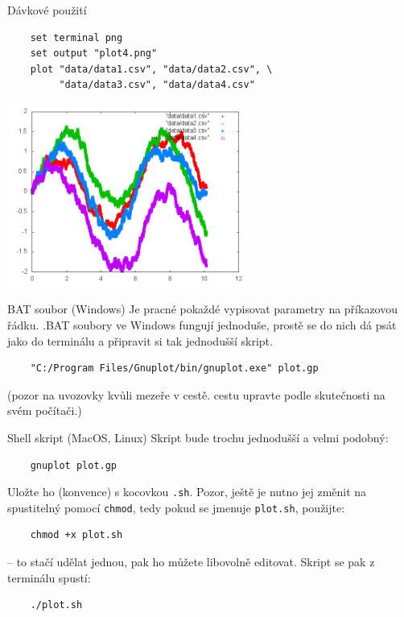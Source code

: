 \documentclass{beamer}
\begin{document}
\begin{frame}[fragile]{Dávkové použití}
  \scriptsize
  \begin{verbatim}
    set terminal png
    set output "plot4.png"
    plot "data/data1.csv", "data/data2.csv", \
         "data/data3.csv", "data/data4.csv"
  \end{verbatim}
  \pause
  \begin{center}
    \includegraphics[width=0.6\textwidth]{../gnuplot/plot4}
  \end{center}
\end{frame}

\begin{frame}[fragile]{BAT soubor (Windows)}
  Je pracné pokaždé vypisovat parametry na příkazovou řádku. .BAT soubory ve Windows fungují jednoduše, prostě se do nich dá psát jako do terminálu a připravit si tak jednodušší skript.
  {\scriptsize
  \begin{verbatim}
    "C:/Program Files/Gnuplot/bin/gnuplot.exe" plot.gp
  \end{verbatim}
  }
  (pozor na uvozovky kvůli mezeře v cestě. cestu upravte podle skutečnosti na svém počítači.)
\end{frame}

\begin{frame}[fragile]{Shell skript (MacOS, Linux)}
  Skript bude trochu jednodušší a velmi podobný:
  \begin{verbatim}
    gnuplot plot.gp
  \end{verbatim}
  Uložte ho (konvence) s kocovkou \texttt{.sh}. Pozor, ještě je nutno jej změnit na spustitelný pomocí \texttt{chmod}, tedy pokud se jmenuje \texttt{plot.sh}, použijte:
  \begin{verbatim}
    chmod +x plot.sh
  \end{verbatim}
  -- to stačí udělat jednou, pak ho můžete libovolně editovat. Skript se pak z terminálu spustí:
  \begin{verbatim}
    ./plot.sh
  \end{verbatim}
\end{frame}
\end{document}
